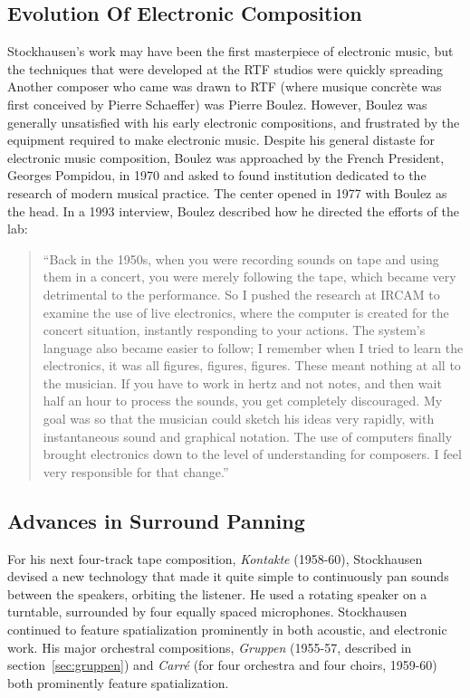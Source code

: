 \subsection{Evolution Of Electronic Composition}
\label{sec:evolution-of-electronic-composition}
Stockhausen's work may have been the first masterpiece of electronic
music, but the techniques that were developed at the RTF studios were
quickly spreading Another composer who came was drawn to RTF (where
musique concr\`{e}te was first conceived by Pierre Schaeffer) was
Pierre Boulez. However, Boulez was generally unsatisfied with his
early electronic compositions, and frustrated by the equipment
required to make electronic music. Despite his general distaste for
electronic music composition, Boulez was approached by the French
President, Georges Pompidou, in 1970 and asked to found institution
dedicated to the research of modern musical practice. The center
opened in 1977 with Boulez as the head. In a 1993 interview, Boulez
described how he directed the efforts of the lab:
\begin{quotation}
  ``Back in the 1950s, when you were recording sounds on tape and using
  them in a concert, you were merely following the tape, which became
  very detrimental to the performance. So I pushed the research at
  IRCAM to examine the use of live electronics, where the computer is
  created for the concert situation, instantly responding to your
  actions. The system's language also became easier to follow; I
  remember when I tried to learn the electronics, it was all figures,
  figures, figures. These meant nothing at all to the musician. If you
  have to work in hertz and not notes, and then wait half an hour to
  process the sounds, you get completely discouraged. My goal was so
  that the musician could sketch his ideas very rapidly, with
  instantaneous sound and graphical notation. The use of computers
  finally brought electronics down to the level of understanding for
  composers. I feel very responsible for that change.''\cite{Carvin1993}
\end{quotation}


\subsection{Advances in Surround Panning}
\label{sec:advanc-surr-pann}
For his next four-track tape composition, \textit{Kontakte}
(1958-60), Stockhausen devised a new technology that made it quite
simple to continuously pan sounds between the speakers, orbiting the
listener. He used a rotating speaker on a turntable, surrounded by
four equally spaced microphones. Stockhausen continued to feature
spatialization prominently in both acoustic, and electronic work.  His
major orchestral compositions, \textit{Gruppen} (1955-57, described in
section~\ref{sec:gruppen}) and \textit{Carr\'{e}} (for four orchestra
and four choirs, 1959-60) both prominently feature spatialization.

